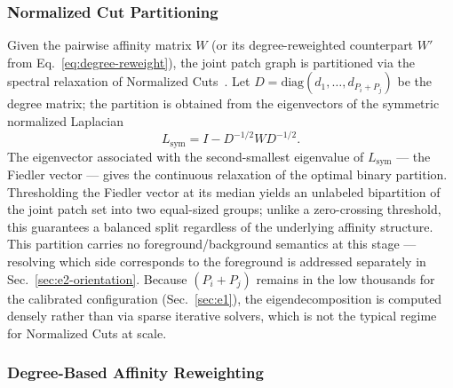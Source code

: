 \subsubsection{Normalized Cut Partitioning}
\label{sec:e2-ncut}

Given the pairwise affinity matrix $W$ (or its degree-reweighted counterpart $W'$ from Eq.~\ref{eq:degree-reweight}), the joint patch graph is partitioned via the spectral relaxation of Normalized Cuts~\cite{shi2000normalized}. Let $D = \mathrm{diag}(d_1, \dots, d_{P_i+P_j})$ be the degree matrix; the partition is obtained from the eigenvectors of the symmetric normalized Laplacian
\begin{equation}
    L_{\mathrm{sym}} = I - D^{-1/2} W D^{-1/2}.
    \label{eq:laplacian}
\end{equation}
The eigenvector associated with the second-smallest eigenvalue of $L_{\mathrm{sym}}$ — the Fiedler vector — gives the continuous relaxation of the optimal binary partition. Thresholding the Fiedler vector at its median yields an unlabeled bipartition of the joint patch set into two equal-sized groups; unlike a zero-crossing threshold, this guarantees a balanced split regardless of the underlying affinity structure. This partition carries no foreground/background semantics at this stage — resolving which side corresponds to the foreground is addressed separately in Sec.~\ref{sec:e2-orientation}. Because $(P_i+P_j)$ remains in the low thousands for the calibrated configuration (Sec.~\ref{sec:e1}), the eigendecomposition is computed densely rather than via sparse iterative solvers, which is not the typical regime for Normalized Cuts at scale.

\subsubsection{Degree-Based Affinity Reweighting}
\label{sec:e2-reweight}

